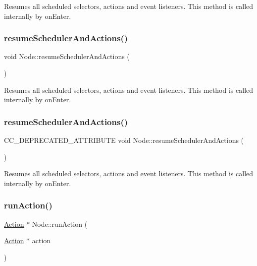 Resumes all scheduled selectors, actions and event listeners. This method is called internally by on\+Enter. \mbox{\label{classNode_add0904e6d8d94df6c5dddc26c230cf4c}} 
\subsubsection{\texorpdfstring{resume\+Scheduler\+And\+Actions()}{resumeSchedulerAndActions()}\hspace{0.1cm}{\footnotesize\ttfamily [1/2]}}
{\footnotesize\ttfamily void Node\+::resume\+Scheduler\+And\+Actions (\begin{DoxyParamCaption}{ }\end{DoxyParamCaption})}

Resumes all scheduled selectors, actions and event listeners. This method is called internally by on\+Enter. \mbox{\label{classNode_ac23454950364265a3da67fb9e8becdd1}} 
\subsubsection{\texorpdfstring{resume\+Scheduler\+And\+Actions()}{resumeSchedulerAndActions()}\hspace{0.1cm}{\footnotesize\ttfamily [2/2]}}
{\footnotesize\ttfamily C\+C\+\_\+\+D\+E\+P\+R\+E\+C\+A\+T\+E\+D\+\_\+\+A\+T\+T\+R\+I\+B\+U\+TE void Node\+::resume\+Scheduler\+And\+Actions (\begin{DoxyParamCaption}{ }\end{DoxyParamCaption})}

Resumes all scheduled selectors, actions and event listeners. This method is called internally by on\+Enter. \mbox{\label{classNode_a07b8c313d5c753c5dbabbe68c77f3128}} 
\subsubsection{\texorpdfstring{run\+Action()}{runAction()}\hspace{0.1cm}{\footnotesize\ttfamily [1/2]}}
{\footnotesize\ttfamily \hyperlink{classAction}{Action} $\ast$ Node\+::run\+Action (\begin{DoxyParamCaption}\item[{\hyperlink{classAction}{Action} $\ast$}]{action }\end{DoxyParamCaption})\hspace{0.3cm}{\ttfamily [virtual]}}

